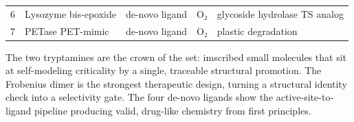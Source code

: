 \begin{longtable}[]{@{}lllll@{}}
\begin{minipage}[t]{0.06\columnwidth}
6\strut
\end{minipage} & \begin{minipage}[t]{0.20\columnwidth}\raggedright
Lysozyme bis-epoxide\strut
\end{minipage} & \begin{minipage}[t]{0.16\columnwidth}\raggedright
de-novo ligand\strut
\end{minipage} & \begin{minipage}[t]{0.12\columnwidth}\raggedright
O₂\strut
\end{minipage} & \begin{minipage}[t]{0.31\columnwidth}\raggedright
glycoside hydrolase TS analog\strut
\end{minipage}\tabularnewline
\begin{minipage}[t]{0.06\columnwidth}\raggedright
7\strut
\end{minipage} & \begin{minipage}[t]{0.20\columnwidth}\raggedright
PETase PET-mimic\strut
\end{minipage} & \begin{minipage}[t]{0.16\columnwidth}\raggedright
de-novo ligand\strut
\end{minipage} & \begin{minipage}[t]{0.12\columnwidth}\raggedright
O₂\strut
\end{minipage} & \begin{minipage}[t]{0.31\columnwidth}\raggedright
plastic degradation\strut
\end{minipage}\tabularnewline
\bottomrule
\end{longtable}

The two tryptamines are the crown of the set: imscribed small molecules
that sit at self-modeling criticality by a single, traceable structural
promotion. The Frobenius dimer is the strongest therapeutic design,
turning a structural identity check into a selectivity gate. The four
de-novo ligands show the active-site-to-ligand pipeline producing valid,
drug-like chemistry from first principles.
